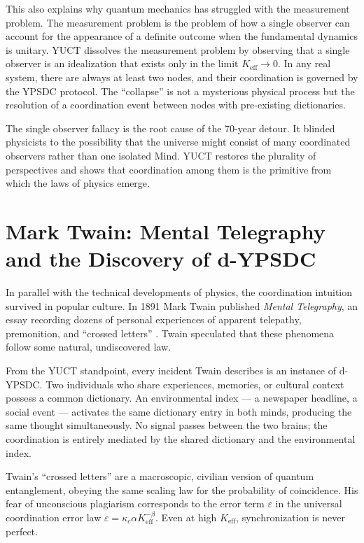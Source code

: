 \documentclass[12pt,a4paper]{article}
\begin{document}
	This also explains why quantum mechanics has struggled with the measurement problem. The measurement problem is the problem of how a single observer can account for the appearance of a definite outcome when the fundamental dynamics is unitary. YUCT dissolves the measurement problem by observing that a single observer is an idealization that exists only in the limit \(K_{\mathrm{eff}} \to 0\). In any real system, there are always at least two nodes, and their coordination is governed by the YPSDC protocol. The ``collapse'' is not a mysterious physical process but the resolution of a coordination event between nodes with pre-existing dictionaries.
	
	The single observer fallacy is the root cause of the 70-year detour. It blinded physicists to the possibility that the universe might consist of many coordinated observers rather than one isolated Mind. YUCT restores the plurality of perspectives and shows that coordination among them is the primitive from which the laws of physics emerge.
	
	\section{Mark Twain: Mental Telegraphy and the Discovery of d-YPSDC}
	
	In parallel with the technical developments of physics, the coordination intuition survived in popular culture. In 1891 Mark Twain published \emph{Mental Telegraphy}, an essay recording dozens of personal experiences of apparent telepathy, premonition, and ``crossed letters'' \cite{Twain1891}. Twain speculated that these phenomena follow some natural, undiscovered law.
	
	From the YUCT standpoint, every incident Twain describes is an instance of d-YPSDC. Two individuals who share experiences, memories, or cultural context possess a common dictionary. An environmental index --- a newspaper headline, a social event --- activates the same dictionary entry in both minds, producing the same thought simultaneously. No signal passes between the two brains; the coordination is entirely mediated by the shared dictionary and the environmental index.
	
	Twain's ``crossed letters'' are a macroscopic, civilian version of quantum entanglement, obeying the same scaling law for the probability of coincidence. His fear of unconscious plagiarism corresponds to the error term \(\varepsilon\) in the universal coordination error law \(\varepsilon = \kappa_c \alpha K_{\mathrm{eff}}^{-\beta}\). Even at high \(K_{\mathrm{eff}}\), synchronization is never perfect.
	
\end{document}
